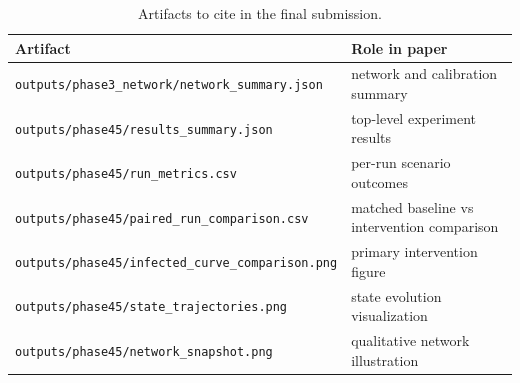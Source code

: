\documentclass[11pt,a4paper]{article}
\begin{document}
\begin{table}[h]
\centering
\begin{tabularx}{\linewidth}{lX}
\toprule
Artifact & Role in paper \\
\midrule
\texttt{outputs/phase3\_network/network\_summary.json} & network and calibration summary \\
\texttt{outputs/phase45/results\_summary.json} & top-level experiment results \\
\texttt{outputs/phase45/run\_metrics.csv} & per-run scenario outcomes \\
\texttt{outputs/phase45/paired\_run\_comparison.csv} & matched baseline vs intervention comparison \\
\texttt{outputs/phase45/infected\_curve\_comparison.png} & primary intervention figure \\
\texttt{outputs/phase45/state\_trajectories.png} & state evolution visualization \\
\texttt{outputs/phase45/network\_snapshot.png} & qualitative network illustration \\
\bottomrule
\end{tabularx}
\caption{Artifacts to cite in the final submission.}
\end{table}
\end{document}
